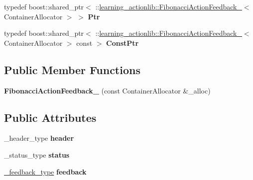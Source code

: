 \begin{DoxyCompactItemize}
typedef boost\+::shared\+\_\+ptr$<$ \+::\hyperlink{structlearning__actionlib_1_1FibonacciActionFeedback__}{learning\+\_\+actionlib\+::\+Fibonacci\+Action\+Feedback\+\_\+}$<$ Container\+Allocator $>$ $>$ {\bfseries Ptr}
\item 
\mbox{\label{structlearning__actionlib_1_1FibonacciActionFeedback___a5d6397e301853f1ce258e5586d5e31f6}} 
typedef boost\+::shared\+\_\+ptr$<$ \+::\hyperlink{structlearning__actionlib_1_1FibonacciActionFeedback__}{learning\+\_\+actionlib\+::\+Fibonacci\+Action\+Feedback\+\_\+}$<$ Container\+Allocator $>$ const  $>$ {\bfseries Const\+Ptr}
\end{DoxyCompactItemize}
\subsection*{Public Member Functions}
\begin{DoxyCompactItemize}
\item 
\mbox{\label{structlearning__actionlib_1_1FibonacciActionFeedback___a555a1f8dde825fa61c74ba988dd76f2b}} 
{\bfseries Fibonacci\+Action\+Feedback\+\_\+} (const Container\+Allocator \&\+\_\+alloc)
\end{DoxyCompactItemize}
\subsection*{Public Attributes}
\begin{DoxyCompactItemize}
\item 
\mbox{\label{structlearning__actionlib_1_1FibonacciActionFeedback___a85d4fdca1fda415e326aaff00e0a6d5c}} 
\+\_\+header\+\_\+type {\bfseries header}
\item 
\mbox{\label{structlearning__actionlib_1_1FibonacciActionFeedback___aa256468a38447bd26ca407c692e956f2}} 
\+\_\+status\+\_\+type {\bfseries status}
\item 
\mbox{\label{structlearning__actionlib_1_1FibonacciActionFeedback___a884e05b51f05bb9c46dba4f6925af930}} 
\hyperlink{structlearning__actionlib_1_1FibonacciFeedback__}{\+\_\+feedback\+\_\+type} {\bfseries feedback}
\end{DoxyCompactItemize}


